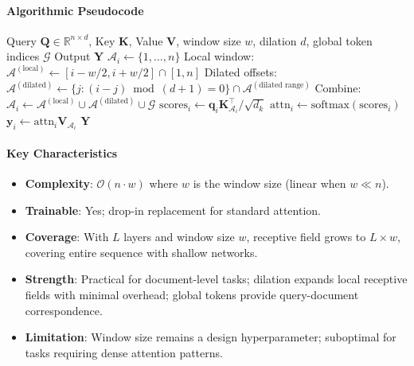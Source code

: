 \paragraph{Algorithmic Pseudocode}

\begin{algorithm}[H]
\caption{Longformer: Sliding Window + Dilated + Global}
\begin{algorithmic}[1]
\Require Query $\mathbf{Q} \in \mathbb{R}^{n \times d}$, Key $\mathbf{K}$, Value $\mathbf{V}$, window size $w$, dilation $d$, global token indices $\mathcal{G}$
\Ensure Output $\mathbf{Y}$
        \State $\mathcal{A}_i \gets \{1, \ldots, n\}$ 
    \Else
        \State Local window: $\mathcal{A}^{(\text{local})} \gets [i - w/2, i + w/2] \cap [1, n]$
        \State Dilated offsets: $\mathcal{A}^{(\text{dilated})} \gets \{j : (i-j) \bmod (d+1) = 0\} \cap \mathcal{A}^{(\text{dilated range})}$
        \State Combine: $\mathcal{A}_i \gets \mathcal{A}^{(\text{local})} \cup \mathcal{A}^{(\text{dilated})} \cup \mathcal{G}$
    \EndIf
    \State $\text{scores}_i \gets \mathbf{q}_i \mathbf{K}_{\mathcal{A}_i}^\top / \sqrt{d_k}$
    \State $\text{attn}_i \gets \text{softmax}(\text{scores}_i)$
    \State $\mathbf{y}_i \gets \text{attn}_i \mathbf{V}_{\mathcal{A}_i}$
\EndFor
\Return $\mathbf{Y}$
\end{algorithmic}
\end{algorithm}

\paragraph{Key Characteristics}

\begin{itemize}[leftmargin=*]
    \item \textbf{Complexity}: $\mathcal{O}(n \cdot w)$ where $w$ is the window size (linear when $w \ll n$).
    \item \textbf{Trainable}: Yes; drop-in replacement for standard attention.
    \item \textbf{Coverage}: With $L$ layers and window size $w$, receptive field grows to $L \times w$, covering entire sequence with shallow networks.
    \item \textbf{Strength}: Practical for document-level tasks; dilation expands local receptive fields with minimal overhead; global tokens provide query-document correspondence.
    \item \textbf{Limitation}: Window size remains a design hyperparameter; suboptimal for tasks requiring dense attention patterns.
\end{itemize}

